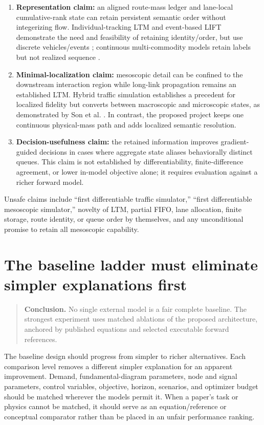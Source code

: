 \documentclass[11pt,a4paper]{article}
\newcommand{\keypoint}[1]{\begin{quote}\colorbox{bluegray}{\parbox{0.93\linewidth}{\textbf{Conclusion.} #1}}\end{quote}}
\begin{document}
\begin{enumerate}
  \item \textbf{Representation claim:} an aligned route-mass ledger and lane-local cumulative-rank state can retain persistent semantic order without integerizing flow. Individual-tracking LTM and event-based LIFT demonstrate the need and feasibility of retaining identity/order, but use discrete vehicles/events \cite{desouza2025,nietal2026}; continuous multi-commodity models retain labels but not realized sequence \cite{wright2015lnctm}.
  \item \textbf{Minimal-localization claim:} mesoscopic detail can be confined to the downstream interaction region while long-link propagation remains an established LTM. Hybrid traffic simulation establishes a precedent for localized fidelity but converts between macroscopic and microscopic states, as demonstrated by Son et al. \cite{son2022}. In contrast, the proposed project keeps one continuous physical-mass path and adds localized semantic resolution.
  \item \textbf{Decision-usefulness claim:} the retained information improves gradient-guided decisions in cases where aggregate state aliases behaviorally distinct queues. This claim is not established by differentiability, finite-difference agreement, or lower in-model objective alone; it requires evaluation against a richer forward model.
\end{enumerate}

Unsafe claims include ``first differentiable traffic simulator,'' ``first differentiable mesoscopic simulator,'' novelty of LTM, partial FIFO, lane allocation, finite storage, route identity, or queue order by themselves, and any unconditional promise to retain all mesoscopic capability.

\section{The baseline ladder must eliminate simpler explanations first}

\keypoint{No single external model is a fair complete baseline. The strongest experiment uses matched ablations of the proposed architecture, anchored by published equations and selected executable forward references.}

The baseline design should progress from simpler to richer alternatives. Each comparison level removes a different simpler explanation for an apparent improvement. Demand, fundamental-diagram parameters, node and signal parameters, control variables, objective, horizon, scenarios, and optimizer budget should be matched wherever the models permit it. When a paper's task or physics cannot be matched, it should serve as an equation/reference or conceptual comparator rather than be placed in an unfair performance ranking.
\end{document}
